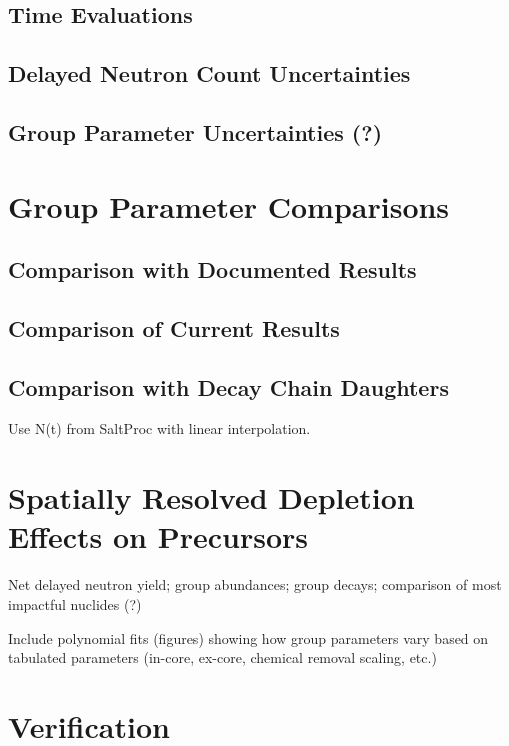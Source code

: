\documentclass[edeposit,fullpage,hidelinks]{uiucthesis2018}
\begin{document}
\subsection{Time Evaluations}
\label{sec:time-eval}

\subsection{Delayed Neutron Count Uncertainties}

\subsection{Group Parameter Uncertainties (?)}

\section{Group Parameter Comparisons}

\subsection{Comparison with Documented Results}

\subsection{Comparison of Current Results}

\subsection{Comparison with Decay Chain Daughters}
\label{sec:decaychaindaughters}
Use N(t) from SaltProc with linear interpolation.

\section{Spatially Resolved Depletion Effects on Precursors}

Net delayed neutron yield; group abundances; group decays; comparison of most impactful nuclides (?)

Include polynomial fits (figures) showing how group parameters vary based on tabulated parameters (in-core, ex-core, chemical removal scaling, etc.)

\section{Verification}
\end{document}
